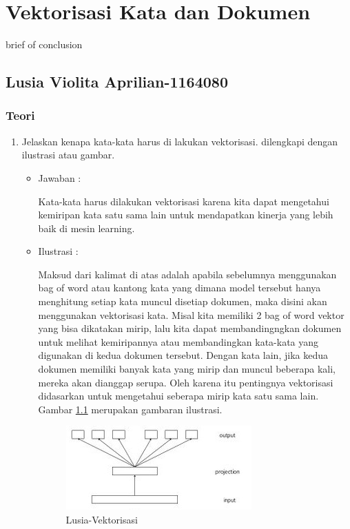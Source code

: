 \chapter{Vektorisasi Kata dan Dokumen}
brief of conclusion

\section{Lusia Violita Aprilian-1164080}

\subsection{Teori}

\begin{enumerate}

\item Jelaskan kenapa kata-kata harus di lakukan vektorisasi. dilengkapi dengan ilustrasi atau gambar.
	\begin{itemize}
	\item Jawaban :
		\par Kata-kata harus dilakukan vektorisasi karena kita dapat mengetahui kemiripan kata satu sama lain untuk mendapatkan kinerja yang lebih baik di mesin learning.
	\item Ilustrasi :
		\par Maksud dari kalimat di atas adalah  apabila sebelumnya menggunakan bag of word atau kantong kata yang dimana model tersebut hanya menghitung setiap kata muncul disetiap dokumen, maka disini akan menggunakan vektorisasi kata. Misal kita memiliki 2 bag of word vektor yang bisa dikatakan mirip, lalu kita dapat membandingngkan dokumen untuk melihat kemiripannya atau membandingkan kata-kata yang digunakan di kedua dokumen tersebut. Dengan kata lain, jika kedua dokumen memiliki banyak kata yang mirip dan muncul beberapa kali, mereka akan dianggap serupa.  Oleh karena itu pentingnya vektorisasi didasarkan untuk mengetahui seberapa mirip kata satu sama lain. Gambar \ref{5a1} merupakan gambaran ilustrasi.
		\begin{figure}[ht]
		\centering
		\includegraphics[scale=0.5]{figures/p1.jpg}
		\caption{Lusia-Vektorisasi}
		\label{5a1}
		\end{figure}
	\end{itemize}


\end{enumerate}
